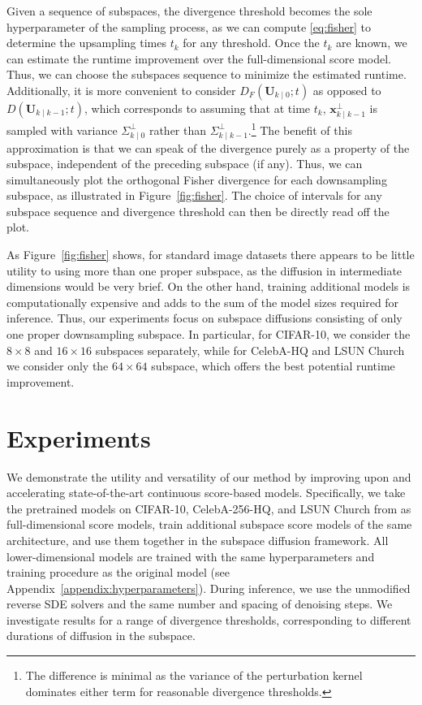 \documentclass{article}
\begin{document}
Given a sequence of subspaces, the divergence threshold becomes the sole hyperparameter of the sampling process, as we can compute \eqref{eq:fisher} to determine the upsampling times $t_k$ for any threshold. Once the $t_k$ are known, we can estimate the runtime improvement over the full-dimensional score model. Thus, we can choose the subspaces sequence to minimize the estimated runtime. Additionally, it is more convenient to consider $D_F(\mathbf{U}_{k\mid 0}; t)$ as opposed to $D(\mathbf{U}_{k\mid k-1}; t)$, which corresponds to assuming that at time $t_k$, $\mathbf{x}_{k\mid k-1}^\perp$ is sampled with variance $\Sigma^\perp_{k\mid 0}$ rather than $\Sigma^\perp_{k\mid k-1}$.\footnote{The difference is minimal as the variance of the perturbation kernel dominates either term for reasonable divergence thresholds.} The benefit of this approximation is that we can speak of the divergence purely as a property of the subspace, independent of the preceding subspace (if any). Thus, we can simultaneously plot the orthogonal Fisher divergence for each downsampling subspace, as illustrated in Figure~\ref{fig:fisher}. The choice of intervals for any subspace sequence and divergence threshold can then be directly read off the plot.

As Figure~\ref{fig:fisher} shows, for standard image datasets there appears to be little utility to using more than one proper subspace, as the diffusion in intermediate dimensions would be very brief. On the other hand, training additional models is computationally expensive and adds to the sum of the model sizes required for inference. Thus, our experiments focus on subspace diffusions consisting of only one proper downsampling subspace. In particular, for CIFAR-10, we consider the $8 \times 8$ and $16 \times 16$ subspaces separately, while for CelebA-HQ and LSUN Church we consider only the $64 \times 64$ subspace, which offers the best potential runtime improvement.




\section{Experiments} \label{sec:experiments}

We demonstrate the utility and versatility of our method by improving upon and accelerating state-of-the-art continuous score-based models. Specifically, we take the pretrained models on CIFAR-10, CelebA-256-HQ, and LSUN Church from \cite{song2021score} as full-dimensional score models, train additional subspace score models of the same architecture, and use them together in the subspace diffusion framework. All lower-dimensional models are trained with the same hyperparameters and training procedure as the original model (see Appendix~\ref{appendix:hyperparameters}). During inference, we use the unmodified reverse SDE solvers and the same number and spacing of denoising steps. We investigate results for a range of divergence thresholds, corresponding to different durations of diffusion in the subspace.
\end{document}
